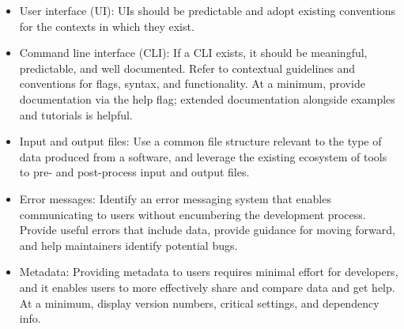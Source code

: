 \documentclass[]{nrel}
\begin{document}
\begin{itemize}
\item User interface (UI): UIs should be predictable and adopt existing conventions for the contexts in which they exist.

\item Command line interface (CLI): If a CLI exists, it should be meaningful, predictable, and well documented.
Refer to contextual guidelines and conventions for flags, syntax, and functionality.
At a minimum, provide documentation via the help flag; extended documentation alongside
examples and tutorials is helpful.

\item Input and output files: Use a common file structure relevant to the type of data produced from a software,
and leverage the existing ecosystem of tools to pre- and post-process input and output files.

\item Error messages: Identify an error messaging system that enables communicating to users without encumbering
the development process.
Provide useful errors that include data, provide guidance for moving forward, and help maintainers
identify potential bugs.

\item Metadata: Providing metadata to users requires minimal effort for developers, and it enables users to more
effectively share and compare data and get help. At a minimum, display version numbers, critical
settings, and dependency info.
\end{itemize}
\end{document}
